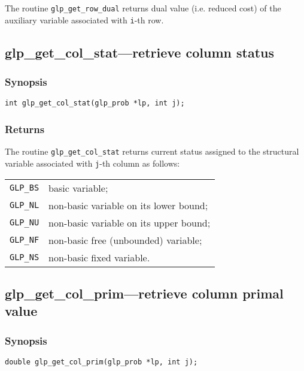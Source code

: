The routine \verb|glp_get_row_dual| returns dual value (i.e. reduced
cost) of the auxiliary variable associated with \verb|i|-th row.

\newpage

\subsection{glp\_get\_col\_stat---retrieve column status}

\subsubsection*{Synopsis}

\begin{verbatim}
int glp_get_col_stat(glp_prob *lp, int j);
\end{verbatim}

\subsubsection*{Returns}

The routine \verb|glp_get_col_stat| returns current status assigned to
the structural variable associated with \verb|j|-th column as follows:

\begin{tabular}{@{}ll}
\verb|GLP_BS| & basic variable; \\
\verb|GLP_NL| & non-basic variable on its lower bound; \\
\verb|GLP_NU| & non-basic variable on its upper bound; \\
\verb|GLP_NF| & non-basic free (unbounded) variable; \\
\verb|GLP_NS| & non-basic fixed variable. \\
\end{tabular}

\subsection{glp\_get\_col\_prim---retrieve column primal value}

\subsubsection*{Synopsis}

\begin{verbatim}
double glp_get_col_prim(glp_prob *lp, int j);
\end{verbatim}

